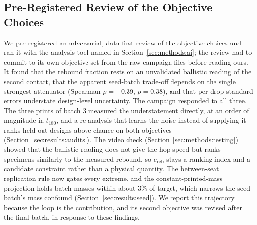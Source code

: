 \documentclass[lineno,nocopyright,upint,varvw,hyphenate]{asmejour}
\begin{document}
\subsection{Pre-Registered Review of the Objective Choices}
\label{sec:discussion:review}
We
pre-registered an adversarial, data-first review of the objective choices
and ran it with the analysis tool named in Section~\ref{sec:methods:ai}; the
review had to commit to its own objective set from the raw campaign files
before reading ours. It found that the rebound fraction rests on an
unvalidated ballistic reading of the second contact, that the apparent
seed-batch trade-off depends on the single strongest attenuator
(Spearman $\rho = -0.39$, $p = 0.38$), and that per-drop standard errors
understate design-level uncertainty. The campaign responded to all
three. The three prints of batch 3 measured the understatement directly,
at an order of magnitude in $t_{180}$, and a re-analysis that learns the
noise instead of supplying it ranks held-out designs above chance on both
objectives (Section~\ref{sec:results:audits}). The video check
(Section~\ref{sec:methods:testing}) showed that the ballistic reading
does not give the hop speed but ranks specimens similarly to the
measured rebound, so $e_{\mathrm{reb}}$ stays a ranking index and a
candidate constraint rather than a physical quantity. The between-seat
replication rule now gates every extreme, and the constant-printed-mass
projection holds batch masses within about 3\% of target, which narrows
the seed batch's mass confound (Section~\ref{sec:results:seed}). We
report this trajectory because the loop is the contribution, and its
second objective was revised after the final batch, in response to
these findings.
\end{document}

